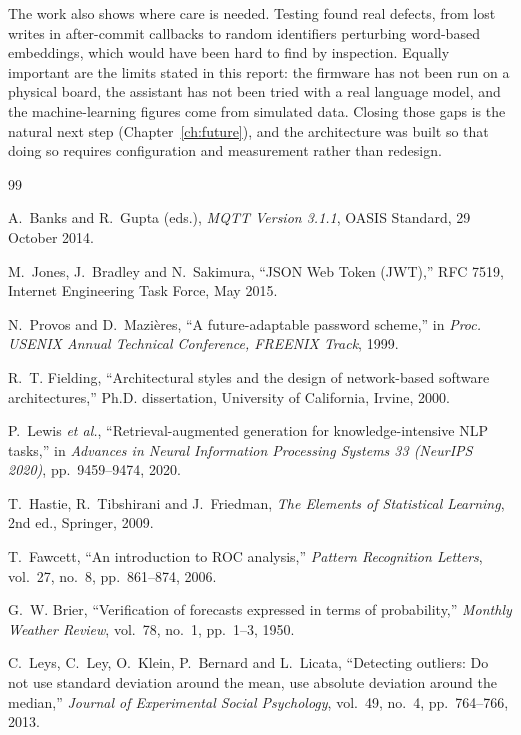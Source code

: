 \documentclass[12pt,a4paper,oneside]{report}
\begin{document}
The work also shows where care is needed. Testing found real defects, from lost writes in after-commit callbacks to random identifiers perturbing word-based embeddings, which would have been hard to find by inspection. Equally important are the limits stated in this report: the firmware has not been run on a physical board, the assistant has not been tried with a real language model, and the machine-learning figures come from simulated data. Closing those gaps is the natural next step (Chapter~\ref{ch:future}), and the architecture was built so that doing so requires configuration and measurement rather than redesign.

\begin{thebibliography}{99}

 A.~Banks and R.~Gupta (eds.), \emph{MQTT Version 3.1.1}, OASIS Standard, 29 October 2014.

 M.~Jones, J.~Bradley and N.~Sakimura, ``JSON Web Token (JWT),'' RFC 7519, Internet Engineering Task Force, May 2015.

 N.~Provos and D.~Mazi\`eres, ``A future-adaptable password scheme,'' in \emph{Proc. USENIX Annual Technical Conference, FREENIX Track}, 1999.

 R.~T. Fielding, ``Architectural styles and the design of network-based software architectures,'' Ph.D. dissertation, University of California, Irvine, 2000.

 P.~Lewis \emph{et al.}, ``Retrieval-augmented generation for knowledge-intensive NLP tasks,'' in \emph{Advances in Neural Information Processing Systems 33 (NeurIPS 2020)}, pp.~9459--9474, 2020.

 T.~Hastie, R.~Tibshirani and J.~Friedman, \emph{The Elements of Statistical Learning}, 2nd ed., Springer, 2009.

 T.~Fawcett, ``An introduction to ROC analysis,'' \emph{Pattern Recognition Letters}, vol.~27, no.~8, pp.~861--874, 2006.

 G.~W. Brier, ``Verification of forecasts expressed in terms of probability,'' \emph{Monthly Weather Review}, vol.~78, no.~1, pp.~1--3, 1950.

 C.~Leys, C.~Ley, O.~Klein, P.~Bernard and L.~Licata, ``Detecting outliers: Do not use standard deviation around the mean, use absolute deviation around the median,'' \emph{Journal of Experimental Social Psychology}, vol.~49, no.~4, pp.~764--766, 2013.


\end{thebibliography}
\end{document}
